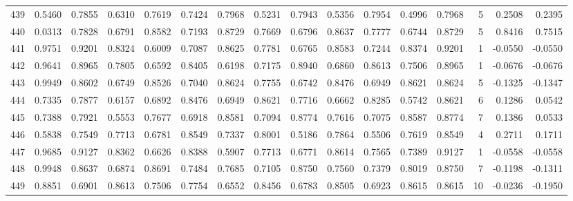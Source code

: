 \begin{tabular}{lrrrrrrrrrrrrrrr}
439 &      0.5460 &  0.7855 &  0.6310 &  0.7619 &  0.7424 &  0.7968 &  0.5231 &  0.7943 &  0.5356 &  0.7954 &   0.4996 &     0.7968 &      5 &                    0.2508 &                     0.2395 \\
440 &      0.0313 &  0.7828 &  0.6791 &  0.8582 &  0.7193 &  0.8729 &  0.7669 &  0.6796 &  0.8637 &  0.7777 &   0.6744 &     0.8729 &      5 &                    0.8416 &                     0.7515 \\
441 &      0.9751 &  0.9201 &  0.8324 &  0.6009 &  0.7087 &  0.8625 &  0.7781 &  0.6765 &  0.8583 &  0.7244 &   0.8374 &     0.9201 &      1 &                   -0.0550 &                    -0.0550 \\
442 &      0.9641 &  0.8965 &  0.7805 &  0.6592 &  0.8405 &  0.6198 &  0.7175 &  0.8940 &  0.6860 &  0.8613 &   0.7506 &     0.8965 &      1 &                   -0.0676 &                    -0.0676 \\
443 &      0.9949 &  0.8602 &  0.6749 &  0.8526 &  0.7040 &  0.8624 &  0.7755 &  0.6742 &  0.8476 &  0.6949 &   0.8621 &     0.8624 &      5 &                   -0.1325 &                    -0.1347 \\
444 &      0.7335 &  0.7877 &  0.6157 &  0.6892 &  0.8476 &  0.6949 &  0.8621 &  0.7716 &  0.6662 &  0.8285 &   0.5742 &     0.8621 &      6 &                    0.1286 &                     0.0542 \\
445 &      0.7388 &  0.7921 &  0.5553 &  0.7677 &  0.6918 &  0.8581 &  0.7094 &  0.8774 &  0.7616 &  0.7075 &   0.8587 &     0.8774 &      7 &                    0.1386 &                     0.0533 \\
446 &      0.5838 &  0.7549 &  0.7713 &  0.6781 &  0.8549 &  0.7337 &  0.8001 &  0.5186 &  0.7864 &  0.5506 &   0.7619 &     0.8549 &      4 &                    0.2711 &                     0.1711 \\
447 &      0.9685 &  0.9127 &  0.8362 &  0.6626 &  0.8388 &  0.5907 &  0.7713 &  0.6771 &  0.8614 &  0.7565 &   0.7389 &     0.9127 &      1 &                   -0.0558 &                    -0.0558 \\
448 &      0.9948 &  0.8637 &  0.6874 &  0.8691 &  0.7484 &  0.7685 &  0.7105 &  0.8750 &  0.7560 &  0.7379 &   0.8019 &     0.8750 &      7 &                   -0.1198 &                    -0.1311 \\
449 &      0.8851 &  0.6901 &  0.8613 &  0.7506 &  0.7754 &  0.6552 &  0.8456 &  0.6783 &  0.8505 &  0.6923 &   0.8615 &     0.8615 &     10 &                   -0.0236 &                    -0.1950 \\

\end{tabular}
